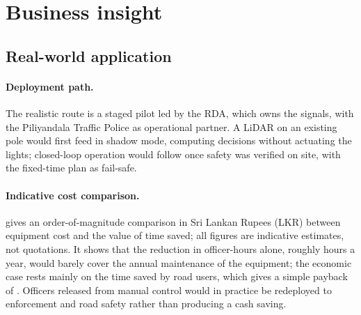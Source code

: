 \section{Business insight}

\subsection{Real-world application}

\paragraph{Deployment path.} The realistic route is a staged pilot led by the RDA, which owns the signals, with the Piliyandala Traffic Police as operational partner. A LiDAR on an existing pole would first feed \prism{} in shadow mode, computing decisions without actuating the lights; closed-loop operation would follow once safety was verified on site, with the fixed-time plan as fail-safe.

\paragraph{Indicative cost comparison.}  gives an order-of-magnitude comparison in Sri Lankan Rupees (LKR) between equipment cost and the value of time saved; all figures are indicative estimates, not quotations. It shows that the reduction in officer-hours alone, roughly  hours a year, would barely cover the annual maintenance of the equipment; the economic case rests mainly on the time saved by road users, which gives a simple payback of . Officers released from manual control would in practice be redeployed to enforcement and road safety rather than producing a cash saving.

